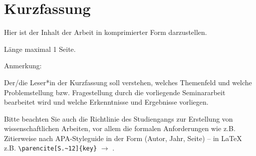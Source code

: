 \chapter*{Kurzfassung}

Hier ist der Inhalt der Arbeit in komprimierter Form darzustellen.

Länge maximal 1 Seite.

Anmerkung:

Der/die Leser*in der Kurzfassung soll verstehen, welches Themenfeld und welche Problemstellung bzw. Fragestellung durch die vorliegende Seminararbeit bearbeitet wird und welche Erkenntnisse und Ergebnisse vorliegen.

Bitte beachten Sie auch die Richtlinie des Studiengangs zur Erstellung von wissenschaftlichen Arbeiten, vor allem die formalen Anforderungen wie z.B. Zitierweise nach APA-Styleguide in der Form (Autor, Jahr, Seite) -- in \LaTeX{} z.B. \verb|\parencite[S.~12]{key}| $\rightarrow$ \parencite[S.~12]{ref01}.

\clearpage
